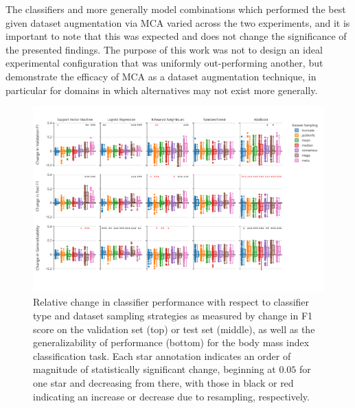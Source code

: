 \documentclass[num-refs]{nbdt-article}
\begin{document}
The classifiers and more generally model combinations which performed the best given dataset augmentation via MCA varied across the two experiments, and it is important to note that this was expected and does not change the significance of the presented findings. The purpose of this work was not to design an ideal experimental configuration that was uniformly out-performing another, but demonstrate the efficacy of MCA as a dataset augmentation technique, in particular for domains in which alternatives may not exist more generally.

\begin{figure}[htbp]\centering
\includegraphics[width=0.8\linewidth]{figures/1_app.pdf}
\caption{Relative change in classifier performance with respect to classifier type and dataset sampling strategies as measured by change in F1 score on the validation set (top) or test set (middle), as well as the generalizability of performance (bottom) for the body mass index classification task. Each star annotation indicates an order of magnitude of statistically significant change, beginning at $0.05$ for one star and decreasing from there, with those in black or red indicating an increase or decrease due to resampling, respectively.}
\label{fig:overall_perf_app}
\end{figure}
\end{document}
